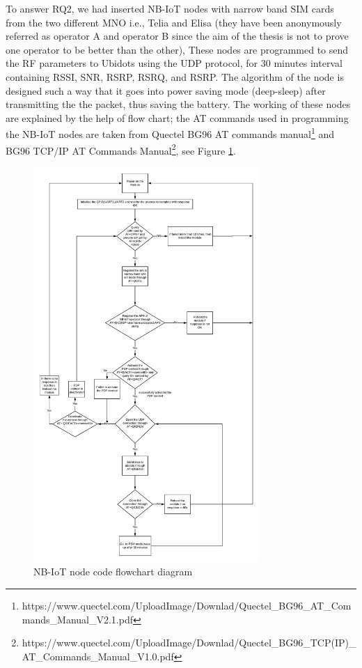 \documentclass[12pt]{article}
\begin{document}
To answer RQ2, we had inserted NB-IoT nodes with narrow band SIM cards from the two different MNO i.e., Telia and Elisa (they have been anonymously referred as operator A and operator B since the aim of the thesis is not to prove one operator to be better than the other), These nodes are programmed to send the RF parameters to Ubidots using the UDP protocol, for 30 minutes interval containing RSSI, SNR, RSRP, RSRQ, and RSRP. The algorithm of the node is designed such a way that it goes into power saving mode (deep-sleep) after transmitting the the packet, thus saving the battery. The working of these nodes are explained by the help of flow chart; the AT commands used in programming the NB-IoT nodes are taken from Quectel BG96 AT commands manual\footnote{https://www.quectel.com/UploadImage/Downlad/Quectel\_BG96\_AT\_Commands\_Manual\_V2.1.pdf} and BG96 TCP/IP AT Commands Manual\footnote{https://www.quectel.com/UploadImage/Downlad/Quectel\_BG96\_TCP(IP)\_AT\_Commands\_Manual\_V1.0.pdf}, see Figure \ref{fig:NB-IoT node code flowchart diagram}. 


\begin{figure}[H]
    \centering
    \includegraphics[width=0.8\columnwidth,height=15cm]{nbiotFlowchart.pdf}
    \caption{NB-IoT node code flowchart diagram}
    \label{fig:NB-IoT node code flowchart diagram}
\end{figure}
\end{document}

